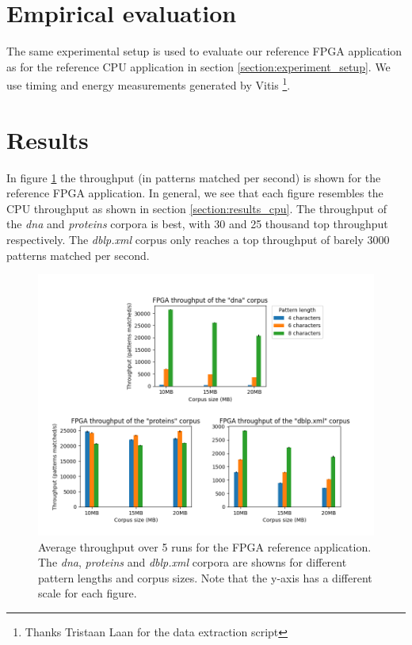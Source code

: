 \section{Empirical evaluation} \label{section:empiric_eval_fpga}

The same experimental setup is used to evaluate our reference FPGA application as for the reference CPU application in section \ref{section:experiment_setup}.
We use timing and energy measurements generated by Vitis \footnote{Thanks Tristaan Laan for the data extraction script}.

\section{Results} \label{section:results_fpga}

In figure \ref{fig:throughput_fpga} the throughput (in patterns matched per second) is shown for the reference FPGA application.
In general, we see that each figure resembles the CPU throughput as shown in section \ref{section:results_cpu}.
The throughput of the \textit{dna} and \textit{proteins} corpora is best, with 30 and 25 thousand top throughput respectively.
The \textit{dblp.xml} corpus only reaches a top throughput of barely 3000 patterns matched per second.

\begin{figure}[H]
\centering
\includegraphics[width=1.0\textwidth]{figures/throughput_fpga.png}
\caption{Average throughput over 5 runs for the FPGA reference application. The \textit{dna}, \textit{proteins} and \textit{dblp.xml} corpora are showns for different pattern lengths and corpus sizes. Note that the y-axis has a different scale for each figure.}
\label{fig:throughput_fpga}
\end{figure}

